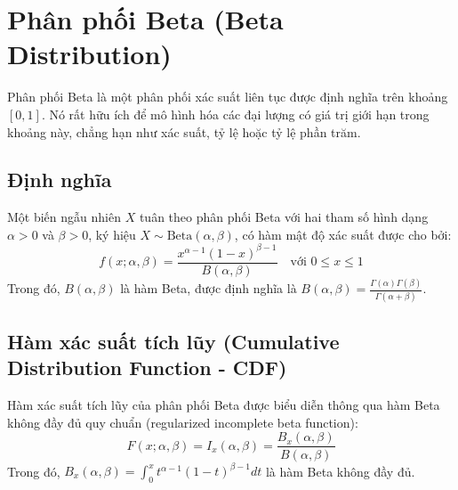 \newpage
\section{Phân phối Beta (Beta Distribution)}
	Phân phối Beta là một phân phối xác suất liên tục được định nghĩa trên khoảng $[0, 1]$. Nó rất hữu ích để mô hình hóa các đại lượng có giá trị giới hạn trong khoảng này, chẳng hạn như xác suất, tỷ lệ hoặc tỷ lệ phần trăm.
	
	
	\subsection{Định nghĩa}
		Một biến ngẫu nhiên $X$ tuân theo phân phối Beta với hai tham số hình dạng $\alpha > 0$ và $\beta > 0$, ký hiệu $X \sim \text{Beta}(\alpha, \beta)$, có hàm mật độ xác suất được cho bởi:
		\[ f(x; \alpha, \beta) = \frac{x^{\alpha-1}(1-x)^{\beta-1}}{B(\alpha, \beta)} \quad \text{với } 0 \le x \le 1 \]
		Trong đó, $B(\alpha, \beta)$ là hàm Beta, được định nghĩa là $B(\alpha, \beta) = \frac{\Gamma(\alpha)\Gamma(\beta)}{\Gamma(\alpha+\beta)}$.
	
	\subsection{Hàm xác suất tích lũy (Cumulative Distribution Function - CDF)}
	Hàm xác suất tích lũy của phân phối Beta được biểu diễn thông qua hàm Beta không đầy đủ quy chuẩn (regularized incomplete beta function):
	\[ F(x; \alpha, \beta) = I_x(\alpha, \beta) = \frac{B_x(\alpha, \beta)}{B(\alpha, \beta)} \]
	Trong đó, $B_x(\alpha, \beta) = \int_0^x t^{\alpha-1}(1-t)^{\beta-1} dt$ là hàm Beta không đầy đủ.
	
